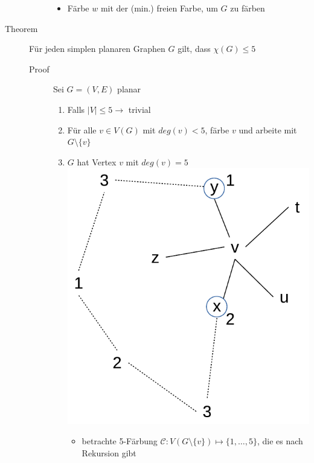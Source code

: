 \begin{description}
\begin{description}
\begin{itemize}
                \item Färbe $w$ mit der (min.) freien Farbe, um $G$ zu färben
            \end{itemize}
        \end{description}
    \item[Theorem] Für jeden simplen planaren Graphen $G$ gilt, dass $\chi(G) \leqslant 5$
        \begin{description}
            \item[Proof] Sei $G=(V,E)$ planar
                \begin{enumerate}
                    \item Falls $|V| \leqslant 5 \rightarrow$ trivial
                    \item Für alle $v \in V(G)$ mit $deg(v) < 5$, färbe $v$ und arbeite mit $G \setminus \{v\}$
                    \item $G$ hat Vertex $v$ mit $deg(v) = 5$
                        \includegraphics[scale=0.5]{lectures/161125/pix/2.pdf}
                        \begin{itemize}
                            \item betrachte 5-Färbung $\mathcal{C} \colon V(G \setminus \{v\}) \mapsto \{1, \dots, 5\}$, die es nach Rekursion gibt

\end{itemize}
\end{enumerate}
\end{description}
\end{description}
